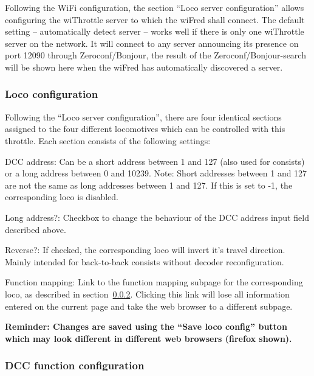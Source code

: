 \documentclass[11pt,a4paper]{scrartcl}
\begin{document}
Following the WiFi configuration, the section ``Loco server configuration'' allows configuring the wiThrottle server to which the wiFred shall connect. The default setting -- automatically detect server -- works well if there is only one wiThrottle server on the network. It will connect to any server announcing its presence on port 12090 through Zeroconf/Bonjour, the result of the Zeroconf/Bonjour-search will be shown here when the wiFred has automatically discovered a server.

\subsubsection{Loco configuration} \label{throttle_LocoConf}

Following the ``Loco server configuration'', there are four identical sections assigned to the four different locomotives which can be controlled with this throttle. Each section consists of the following settings:

\begin{description}
\item{DCC address:} Can be a short address between 1 and 127 (also used for consists) or a long address between 0 and 10239. Note: Short addresses between 1 and 127 are not the same as long addresses between 1 and 127. If this is set to -1, the corresponding loco is disabled.
\item{Long address?:} Checkbox to change the behaviour of the DCC address input field described above.
\item{Reverse?:} If checked, the corresponding loco will invert it's travel direction. Mainly intended for back-to-back consists without decoder reconfiguration.
\item{Function mapping:} Link to the function mapping subpage for the corresponding loco, as described in section~\ref{throttle_FunctionConf}. Clicking this link will lose all information entered on the current page and take the web browser to a different subpage.
\end{description}

\textbf{Reminder: Changes are saved using the ``Save loco config'' button which may look different in different web browsers (firefox shown).}

\subsubsection{DCC function configuration} \label{throttle_FunctionConf}
\end{document}

